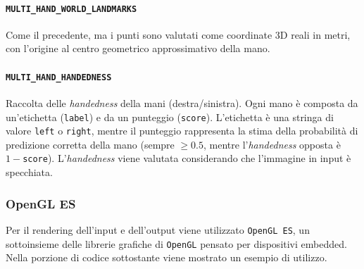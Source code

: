 \paragraph{\texttt{MULTI\_HAND\_WORLD\_LANDMARKS}} Come il precedente, ma i punti sono valutati come coordinate 3D reali in metri, con l'origine al centro geometrico approssimativo della mano.

\paragraph{\texttt{MULTI\_HAND\_HANDEDNESS}} Raccolta delle \textit{handedness} della mani (destra/sinistra). Ogni mano è composta da un'etichetta (\texttt{label}) e da un punteggio (\texttt{score}). L'etichetta è una stringa di valore \texttt{left} o \texttt{right}, mentre il punteggio rappresenta la stima della probabilità di predizione corretta della mano (sempre $\ge 0.5$, mentre l'\textit{handedness} opposta è $1-$\texttt{score}). L'\textit{handedness} viene valutata considerando che l'immagine in input è specchiata. 

\vspace{+40 px}

\subsubsection{OpenGL ES}
Per il rendering dell'input e dell'output viene utilizzato \texttt{OpenGL ES}, un sottoinsieme delle librerie grafiche di \texttt{OpenGL} pensato per dispositivi embedded.\\
Nella porzione di codice sottostante viene mostrato un esempio di utilizzo.

